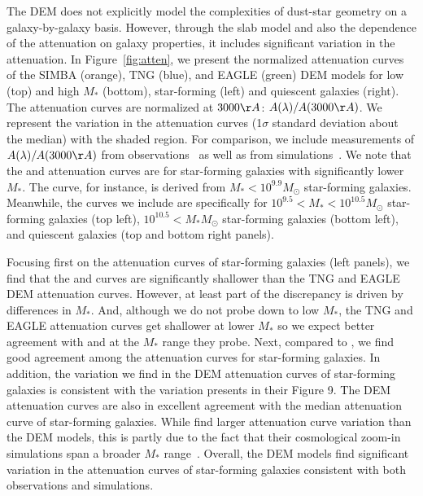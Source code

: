 The DEM does not explicitly model the complexities of dust-star geometry on a
galaxy-by-galaxy basis. However, through the slab model and also the dependence of
the attenuation on galaxy properties, it includes significant variation in the
attenuation. In Figure~\ref{fig:atten}, we present the normalized attenuation 
curves of the SIMBA (orange), TNG (blue), and EAGLE (green) DEM models for low 
(top) and high $M_*$ (bottom), star-forming (left) and quiescent galaxies (right).
The attenuation curves are normalized at $3000\AA$: $A(\lambda)/A(3000\AA)$.
We represent the variation in the attenuation curves (1$\sigma$ standard
deviation about the median) with the shaded region. For comparison, we include measurements 
of $A(\lambda)/A(3000\AA)$ from observations~\citep{caleztti2000, battisti2017, salim2018} 
as well as from simulations~\cite{narayanan2018}. We note that the \cite{calzetti2000} and
\cite{battisti2017} attenuation curves are for star-forming galaxies with
significantly lower $M_*$. The \cite{battisti2017} curve, for instance, is
derived from $M_* < 10^{9.9}M_\odot$ star-forming galaxies. Meanwhile, the
\cite{salim2018} curves we include are specifically for $10^{9.5} < M_* < 10^{10.5}M_\odot$ 
star-forming galaxies (top left), $10^{10.5} < M_*M_\odot$ star-forming
galaxies (bottom left), and quiescent galaxies (top and bottom right panels). 


Focusing first on the attenuation curves of star-forming galaxies (left
panels), we find that the \cite{calzetti2000} and \cite{battisit2017} curves
are significantly shallower than the TNG and EAGLE DEM attenuation curves.
However, at least part of the discrepancy is driven by differences in $M_*$.
And, although we do not probe down to low $M_*$, the TNG and EAGLE attenuation 
curves get shallower at lower $M_*$ so we expect better agreement with 
\cite{calzetti2000} and \cite{battisit2017} at the $M_*$ range they probe. 
Next, compared to \cite{salim2018}, we find good agreement among the attenuation
curves for star-forming galaxies. In addition, the variation we find in the
DEM attenuation curves of star-forming galaxies is consistent with the
variation \cite{salim2018} presents in their Figure 9. The DEM attenuation
curves are also in excellent agreement with the median attenuation curve of
\cite{narayanan2018} star-forming galaxies. While \cite{narayanan2018} find
larger attenuation curve variation than the DEM models, this is partly due to
the fact that their cosmological zoom-in simulations span a broader $M_*$ 
range~\citep{abruzzo2018}. Overall, the DEM models find significant variation 
in the attenuation curves of star-forming galaxies consistent with both observations and
simulations. 


